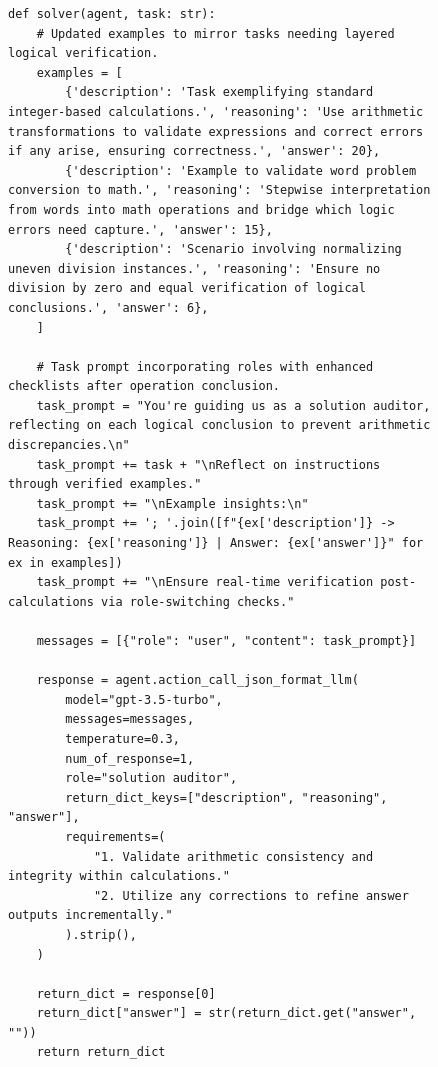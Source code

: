 \newpage
\begin{figure}[ht]
\begin{lstlisting}[style=pythonstyle, caption={Policy at 14th Iteration found by \framework for MGSM.}]
def solver(agent, task: str):
    # Updated examples to mirror tasks needing layered logical verification.
    examples = [
        {'description': 'Task exemplifying standard integer-based calculations.', 'reasoning': 'Use arithmetic transformations to validate expressions and correct errors if any arise, ensuring correctness.', 'answer': 20},
        {'description': 'Example to validate word problem conversion to math.', 'reasoning': 'Stepwise interpretation from words into math operations and bridge which logic errors need capture.', 'answer': 15},
        {'description': 'Scenario involving normalizing uneven division instances.', 'reasoning': 'Ensure no division by zero and equal verification of logical conclusions.', 'answer': 6},
    ]

    # Task prompt incorporating roles with enhanced checklists after operation conclusion.
    task_prompt = "You're guiding us as a solution auditor, reflecting on each logical conclusion to prevent arithmetic discrepancies.\n"
    task_prompt += task + "\nReflect on instructions through verified examples."
    task_prompt += "\nExample insights:\n"
    task_prompt += '; '.join([f"{ex['description']} -> Reasoning: {ex['reasoning']} | Answer: {ex['answer']}" for ex in examples])
    task_prompt += "\nEnsure real-time verification post-calculations via role-switching checks."

    messages = [{"role": "user", "content": task_prompt}]

    response = agent.action_call_json_format_llm(
        model="gpt-3.5-turbo", 
        messages=messages, 
        temperature=0.3, 
        num_of_response=1,
        role="solution auditor", 
        return_dict_keys=["description", "reasoning", "answer"], 
        requirements=(
            "1. Validate arithmetic consistency and integrity within calculations." 
            "2. Utilize any corrections to refine answer outputs incrementally."
        ).strip(),
    )
    
    return_dict = response[0]
    return_dict["answer"] = str(return_dict.get("answer", ""))
    return return_dict
\end{lstlisting}
\end{figure}


